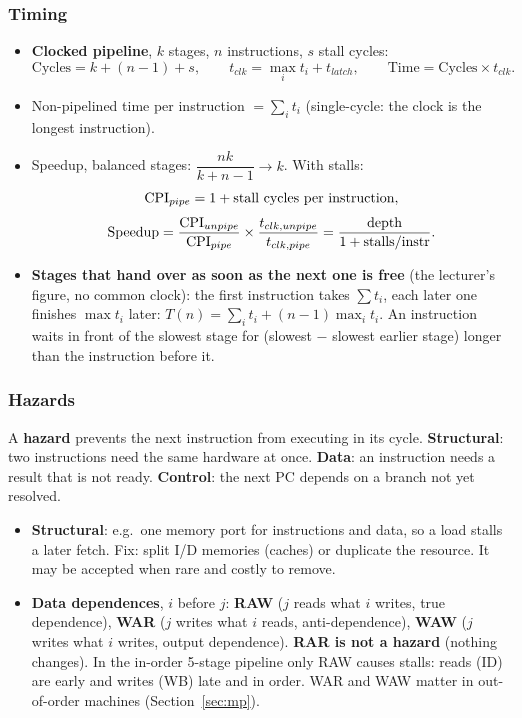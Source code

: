 \subsubsection{Timing}
\begin{itemize}[leftmargin=*]
  \item \textbf{Clocked pipeline}, $k$ stages, $n$ instructions, $s$ stall cycles:
  \[
    \text{Cycles}=k+(n-1)+s,\qquad t_{clk}=\max_i t_i+t_{latch},\qquad
    \text{Time}=\text{Cycles}\times t_{clk}.
  \]
  \item Non-pipelined time per instruction $=\sum_i t_i$ (single-cycle: the clock
  is the longest instruction).
  \item Speedup, balanced stages: $\dfrac{nk}{k+n-1}\to k$. With stalls:
  \[
    \mathrm{CPI}_{pipe}=1+\text{stall cycles per instruction},
  \]
  \[
    \text{Speedup}=\frac{\mathrm{CPI}_{unpipe}}{\mathrm{CPI}_{pipe}}\times\frac{t_{clk,unpipe}}{t_{clk,pipe}}
    =\frac{\text{depth}}{1+\text{stalls/instr}}.
  \]
  \item \textbf{Stages that hand over as soon as the next one is free} (the
  lecturer's figure, no common clock): the first instruction takes $\sum t_i$, each
  later one finishes $\max t_i$ later:
  $T(n)=\sum_i t_i+(n-1)\max_i t_i$. An instruction waits in front of the slowest
  stage for (slowest $-$ slowest earlier stage) longer than the instruction before it.
\end{itemize}

\subsubsection{Hazards}
\begin{definition}[Hazards]
A \textbf{hazard} prevents the next instruction from executing in its cycle.
\textbf{Structural}: two instructions need the same hardware at once.
\textbf{Data}: an instruction needs a result that is not ready.
\textbf{Control}: the next PC depends on a branch not yet resolved.
\end{definition}
\begin{itemize}[leftmargin=*]
  \item \textbf{Structural}: e.g.\ one memory port for instructions and data, so a
  load stalls a later fetch. Fix: split I/D memories (caches) or duplicate the
  resource. It may be accepted when rare and costly to remove.
  \item \textbf{Data dependences}, $i$ before $j$:
  \textbf{RAW} ($j$ reads what $i$ writes, true dependence),
  \textbf{WAR} ($j$ writes what $i$ reads, anti-dependence),
  \textbf{WAW} ($j$ writes what $i$ writes, output dependence).
  \textbf{RAR is not a hazard} (nothing changes). In the in-order 5-stage pipeline
  only RAW causes stalls: reads (ID) are early and writes (WB) late and in order.
  WAR and WAW matter in out-of-order machines (Section~\ref{sec:mp}).
\end{itemize}

